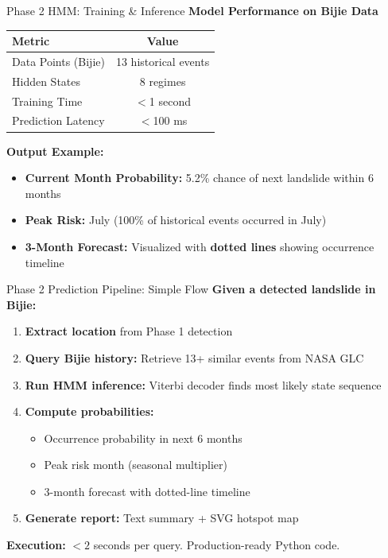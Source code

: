 \documentclass[aspectratio=169]{beamer}
\begin{document}
\begin{frame}{Phase 2 HMM: Training & Inference}
    \textbf{Model Performance on Bijie Data}
    \begin{table}
        \centering
        \small
        \begin{tabular}{lc}
            \toprule
            \textbf{Metric} & \textbf{Value} \\
            \midrule
            Data Points (Bijie) & 13 historical events \\
            Hidden States & 8 regimes \\
            Training Time & $<$1 second \\
            Prediction Latency & $<$100 ms \\
            \bottomrule
        \end{tabular}
    \end{table}

    \vspace{0.3cm}
    \textbf{Output Example:}
    \begin{itemize}
        \item \textbf{Current Month Probability:} 5.2\% chance of next landslide within 6 months
        \item \textbf{Peak Risk:} July (100\% of historical events occurred in July)
        \item \textbf{3-Month Forecast:} Visualized with \textbf{dotted lines} showing occurrence timeline
    \end{itemize}
\end{frame}

\begin{frame}{Phase 2 Prediction Pipeline: Simple Flow}
    \textbf{Given a detected landslide in Bijie:}

    \vspace{0.3cm}
    \begin{enumerate}
        \item \textbf{Extract location} from Phase 1 detection
        \item \textbf{Query Bijie history:} Retrieve 13+ similar events from NASA GLC
        \item \textbf{Run HMM inference:} Viterbi decoder finds most likely state sequence
        \item \textbf{Compute probabilities:}
            \begin{itemize}
                \item Occurrence probability in next 6 months
                \item Peak risk month (seasonal multiplier)
                \item 3-month forecast with dotted-line timeline
            \end{itemize}
        \item \textbf{Generate report:} Text summary + SVG hotspot map
    \end{enumerate}

    \vspace{0.3cm}
    \textbf{Execution:} $<2$ seconds per query. Production-ready Python code.
\end{frame}
\end{document}
